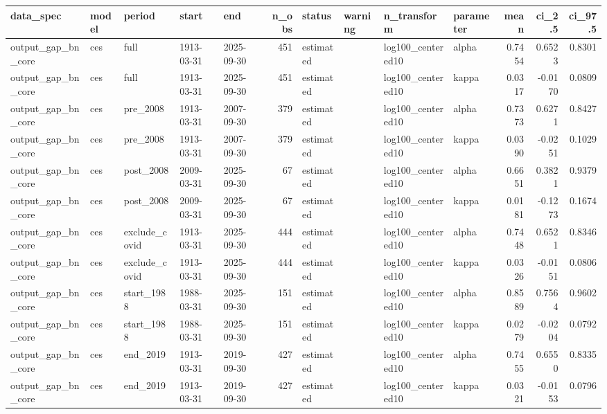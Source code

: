 \begin{tabular}{lllllrllllrrr}
\toprule
data\_spec & model & period & start & end & n\_obs & status & warning & n\_transform & parameter & mean & ci\_2.5 & ci\_97.5 \\
\midrule
output\_gap\_bn\_core & ces & full & 1913-03-31 & 2025-09-30 & 451 & estimated &  & log100\_centered10 & alpha & 0.7454 & 0.6523 & 0.8301 \\
output\_gap\_bn\_core & ces & full & 1913-03-31 & 2025-09-30 & 451 & estimated &  & log100\_centered10 & kappa & 0.0317 & -0.0170 & 0.0809 \\
output\_gap\_bn\_core & ces & pre\_2008 & 1913-03-31 & 2007-09-30 & 379 & estimated &  & log100\_centered10 & alpha & 0.7373 & 0.6271 & 0.8427 \\
output\_gap\_bn\_core & ces & pre\_2008 & 1913-03-31 & 2007-09-30 & 379 & estimated &  & log100\_centered10 & kappa & 0.0390 & -0.0251 & 0.1029 \\
output\_gap\_bn\_core & ces & post\_2008 & 2009-03-31 & 2025-09-30 & 67 & estimated &  & log100\_centered10 & alpha & 0.6651 & 0.3821 & 0.9379 \\
output\_gap\_bn\_core & ces & post\_2008 & 2009-03-31 & 2025-09-30 & 67 & estimated &  & log100\_centered10 & kappa & 0.0181 & -0.1273 & 0.1674 \\
output\_gap\_bn\_core & ces & exclude\_covid & 1913-03-31 & 2025-09-30 & 444 & estimated &  & log100\_centered10 & alpha & 0.7448 & 0.6521 & 0.8346 \\
output\_gap\_bn\_core & ces & exclude\_covid & 1913-03-31 & 2025-09-30 & 444 & estimated &  & log100\_centered10 & kappa & 0.0326 & -0.0151 & 0.0806 \\
output\_gap\_bn\_core & ces & start\_1988 & 1988-03-31 & 2025-09-30 & 151 & estimated &  & log100\_centered10 & alpha & 0.8589 & 0.7564 & 0.9602 \\
output\_gap\_bn\_core & ces & start\_1988 & 1988-03-31 & 2025-09-30 & 151 & estimated &  & log100\_centered10 & kappa & 0.0279 & -0.0204 & 0.0792 \\
output\_gap\_bn\_core & ces & end\_2019 & 1913-03-31 & 2019-09-30 & 427 & estimated &  & log100\_centered10 & alpha & 0.7455 & 0.6550 & 0.8335 \\
output\_gap\_bn\_core & ces & end\_2019 & 1913-03-31 & 2019-09-30 & 427 & estimated &  & log100\_centered10 & kappa & 0.0321 & -0.0153 & 0.0796 \\
\bottomrule
\end{tabular}
